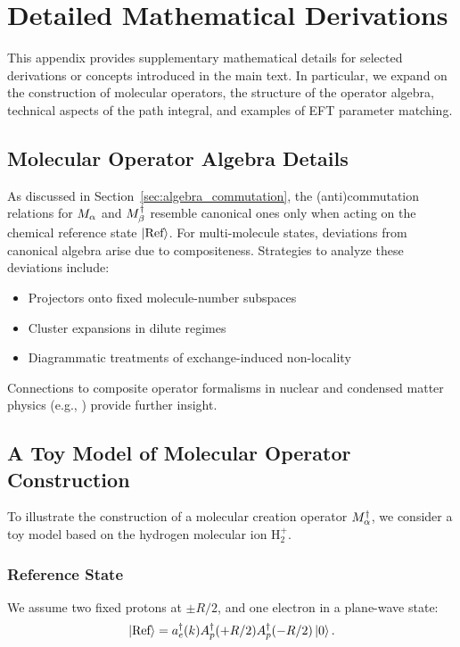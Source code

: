 \appendix

\chapter{Detailed Mathematical Derivations}
\label{app:derivations}

This appendix provides supplementary mathematical details for selected derivations or concepts introduced in the main text. In particular, we expand on the construction of molecular operators, the structure of the operator algebra, technical aspects of the path integral, and examples of EFT parameter matching.

\section{Molecular Operator Algebra Details}
\label{app:sec:algebra_details}

As discussed in Section~\ref{sec:algebra_commutation}, the (anti)commutation relations for \( M_{\alpha} \) and \( M^\dagger_{\beta} \) resemble canonical ones only when acting on the chemical reference state \( \ket{\text{Ref}} \). For multi-molecule states, deviations from canonical algebra arise due to compositeness. Strategies to analyze these deviations include:

\begin{itemize}
  \item Projectors onto fixed molecule-number subspaces
  \item Cluster expansions in dilute regimes
  \item Diagrammatic treatments of exchange-induced non-locality
\end{itemize}

Connections to composite operator formalisms in nuclear and condensed matter physics (e.g., \cite{Combescot2008}) provide further insight.

\section{A Toy Model of Molecular Operator Construction}
\label{app:toy_model_mdag}

To illustrate the construction of a molecular creation operator \( M^\dagger_{\alpha} \), we consider a toy model based on the hydrogen molecular ion \( \mathrm{H}_2^+ \).

\subsection*{Reference State}
We assume two fixed protons at \( \pm R/2 \), and one electron in a plane-wave state:
\[
\ket{\text{Ref}} = a^\dagger_e(k) A^\dagger_p(+R/2) A^\dagger_p(-R/2) \ket{0}.
\]

